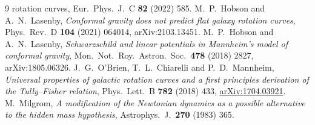 \documentclass[11pt]{article}
\theoremstyle{definition}
\theoremstyle{remark}
\begin{document}
\begin{thebibliography}{9}
{  rotation curves}, Eur.\ Phys.\ J.\ C \textbf{82} (2022) 585.
 M.~P.~Hobson and A.~N.~Lasenby,
  \emph{Conformal gravity does not predict flat galaxy rotation curves},
  Phys.\ Rev.\ D \textbf{104} (2021) 064014, arXiv:2103.13451.
 M.~P.~Hobson and A.~N.~Lasenby,
  \emph{Schwarzschild and linear potentials in Mannheim's model of conformal
  gravity}, Mon.\ Not.\ Roy.\ Astron.\ Soc.\ \textbf{478} (2018) 2827,
  arXiv:1805.06326.
 J.~G.~O'Brien, T.~L.~Chiarelli and P.~D.~Mannheim,
  \emph{Universal properties of galactic rotation curves and a first principles
  derivation of the Tully--Fisher relation}, Phys.\ Lett.\ B \textbf{782}
  (2018) 433, \href{https://arxiv.org/abs/1704.03921}{arXiv:1704.03921}.
 M.~Milgrom,
  \emph{A modification of the Newtonian dynamics as a possible alternative to
  the hidden mass hypothesis}, Astrophys.\ J.\ \textbf{270} (1983) 365.
\end{thebibliography}
\end{document}
